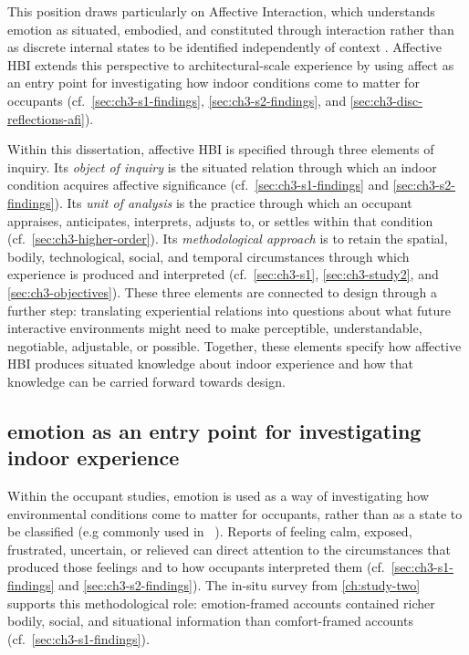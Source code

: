 This position draws particularly on Affective Interaction, which understands emotion as situated, embodied, and constituted through interaction rather than as discrete internal states to be identified independently of context \cite{boehner2005affect,boehner2007emotion,lottridge2011affective, hook2009affective,ahmadpour2025affective}.  Affective HBI extends this
perspective to architectural-scale experience by using affect as an
entry point for investigating how indoor conditions come to matter for
occupants (cf.~\autoref{sec:ch3-s1-findings}, \autoref{sec:ch3-s2-findings}, and \autoref{sec:ch3-disc-reflections-afi}).


Within this dissertation, affective HBI is specified through three
elements of inquiry. Its \emph{object of inquiry} is the situated relation through which an indoor condition acquires affective significance (cf.~\autoref{sec:ch3-s1-findings} and \autoref{sec:ch3-s2-findings}). Its \emph{unit of analysis} is the practice through which an occupant appraises, anticipates, interprets, adjusts to, or settles within that condition (cf.~\autoref{sec:ch3-higher-order}). Its \emph{methodological approach} is to retain the spatial, bodily, technological, social, and temporal circumstances through which experience is produced and interpreted (cf.~\autoref{sec:ch3-s1}, \autoref{sec:ch3-study2}, and \autoref{sec:ch3-objectives}). These three elements are connected to design through a further step: translating experiential relations into questions about what future interactive environments might need to make perceptible, understandable, negotiable, adjustable, or possible. Together, these elements specify how affective HBI produces situated
knowledge about indoor experience and how that knowledge can be carried
forward towards design.


\subsection{emotion as an entry point for investigating indoor experience}
\label{subsec:emotion-entry-point}

Within the occupant studies, emotion is used as a way of investigating
how environmental conditions come to matter for occupants, rather than
as a state to be classified (e.g commonly used in ~\cite{picard1999affective, gao2020n}). Reports of feeling calm, exposed, frustrated, uncertain, or relieved can direct attention to the circumstances that produced those feelings and to how occupants interpreted them (cf.~\autoref{sec:ch3-s1-findings} and \autoref{sec:ch3-s2-findings}). The in-situ survey from \autoref{ch:study-two} supports this methodological role: emotion-framed accounts contained richer bodily, social, and situational information than comfort-framed accounts (cf.~\autoref{sec:ch3-s1-findings}).

